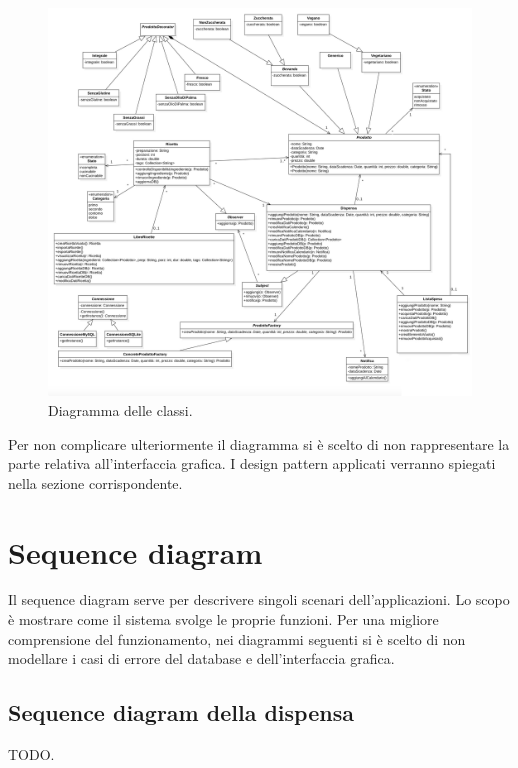 \begin{figure}[H]
    \includegraphics[width=\linewidth]{images/class.jpeg}
    \caption{Diagramma delle classi.}
    \label{fig:classdiagram}
\end{figure}

Per non complicare ulteriormente il diagramma si è scelto di non rappresentare la parte relativa all'interfaccia grafica. I design pattern applicati verranno spiegati nella sezione corrispondente.

\newpage

\section{Sequence diagram}

Il sequence diagram serve per descrivere singoli scenari dell'applicazioni. Lo scopo è mostrare come il sistema svolge le proprie funzioni. Per una migliore comprensione del funzionamento, nei diagrammi seguenti si è scelto di non modellare i casi di errore del database e dell'interfaccia grafica. 

\subsection{Sequence diagram della dispensa}

TODO.

